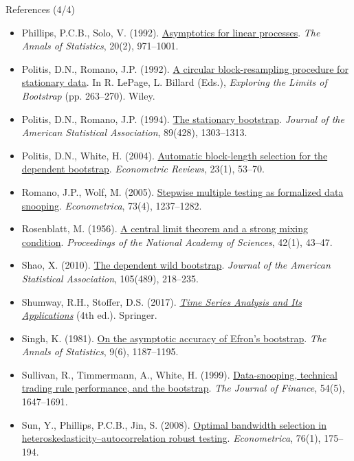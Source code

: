 \begin{frame}{References (4/4)}
\itemsize{\tiny}
\begin{itemize}
    \item Phillips, P.C.B., Solo, V. (1992). \href{https://doi.org/10.1214/aos/1176348666}{Asymptotics for linear processes}. \emph{The Annals of Statistics}, 20(2), 971--1001.
    \item Politis, D.N., Romano, J.P. (1992). \href{https://openlibrary.org/books/OL1551704M}{A circular block-resampling procedure for stationary data}. In R. LePage, L. Billard (Eds.), \emph{Exploring the Limits of Bootstrap} (pp. 263--270). Wiley.
    \item Politis, D.N., Romano, J.P. (1994). \href{https://doi.org/10.1080/01621459.1994.10476870}{The stationary bootstrap}. \emph{Journal of the American Statistical Association}, 89(428), 1303--1313.
    \item Politis, D.N., White, H. (2004). \href{https://doi.org/10.1081/ETC-120028836}{Automatic block-length selection for the dependent bootstrap}. \emph{Econometric Reviews}, 23(1), 53--70.
    \item Romano, J.P., Wolf, M. (2005). \href{https://doi.org/10.1111/j.1468-0262.2005.00615.x}{Stepwise multiple testing as formalized data snooping}. \emph{Econometrica}, 73(4), 1237--1282.
    \item Rosenblatt, M. (1956). \href{https://doi.org/10.1073/pnas.42.1.43}{A central limit theorem and a strong mixing condition}. \emph{Proceedings of the National Academy of Sciences}, 42(1), 43--47.
    \item Shao, X. (2010). \href{https://doi.org/10.1198/jasa.2009.tm08744}{The dependent wild bootstrap}. \emph{Journal of the American Statistical Association}, 105(489), 218--235.
    \item Shumway, R.H., Stoffer, D.S. (2017). \href{https://doi.org/10.1007/978-3-319-52452-8}{\emph{Time Series Analysis and Its Applications}} (4th ed.). Springer.
    \item Singh, K. (1981). \href{https://doi.org/10.1214/aos/1176345636}{On the asymptotic accuracy of Efron's bootstrap}. \emph{The Annals of Statistics}, 9(6), 1187--1195.
    \item Sullivan, R., Timmermann, A., White, H. (1999). \href{https://doi.org/10.1111/0022-1082.00163}{Data-snooping, technical trading rule performance, and the bootstrap}. \emph{The Journal of Finance}, 54(5), 1647--1691.
    \item Sun, Y., Phillips, P.C.B., Jin, S. (2008). \href{https://doi.org/10.1111/j.0012-9682.2008.00822.x}{Optimal bandwidth selection in heteroskedasticity--autocorrelation robust testing}. \emph{Econometrica}, 76(1), 175--194.

\end{itemize}
\end{frame}
